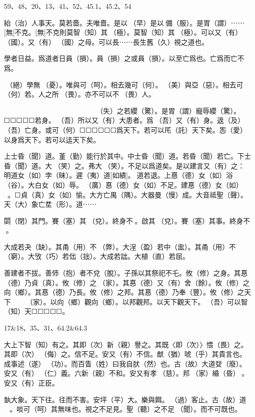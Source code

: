 \documentclass[a4paper]{ctexart}
\begin{document}
    59、48、20、13、41、52、45.1、45.2、54

    紿（治）人事天。莫若嗇。夫唯嗇。是以󶵙（早）是以󶵙備（服）。是胃（謂）⋯⋯[無]不克。[無]不克則莫智（知）其𠄨（極）。莫智（知）其𠄨（極）。可以又（有）󼷜（國）。又（有）󼷜（國）之母。可以長⋯⋯長生舊（久）視之道也。

    學者日益。爲道者日員（損）。員（損）之或員（損）。以至亡爲也。亡爲而亡不爲。

    󶴐（絕）學無𢝊（憂）。唯與可（呵）。相去幾可（何）。𡵂（美）與亞（惡）。相去可（何）若。人之所𥚸（畏）。亦不可以不𥚸（畏）人。

    𢤲（寵）辱若纓（驚）。貴大患若身。可（何）胃（謂）𢤲（寵）辱。𢤲（寵）爲下也。得之若纓（驚）。󶴡（失）之若纓（驚）。是胃（謂）寵辱纓（驚）。☐☐☐☐☐若身。󼾲（吾）所以又（有）大患者。爲󼾲（吾）又（有）身。﨤（及）󼾲（吾）亡身。或可（何）☐☐☐☐☐☐爲天下。若可以厇（託）天下矣。㤅（愛）以身爲天下。若可以迲天下矣。

    上士昏（聞）道。堇（勤）能行於其中。中士昏（聞）道。若昏（聞）若亡。下士昏（聞）道。大𦬫（笑）之。弗大𦬫（笑）。不足以爲道矣。是以建言又（有）之：明道女（如）孛（昧）。遲（夷）道[如繢]。☐道若退。上惪（德）女（如）浴（谷）。大白女（如）辱。󼧊（廣）惪（德）女（如）不足。建惪（德）女（如）󲳴☐。☐貞（真）女（如）愉。大方亡禺（隅）。大器曼（慢）成。大音祗聖（聲）。天（大）象亡坓（形）。道⋯⋯

    閟（閉）其門。賽（塞）其𨓚（兌）。終身不󼲆。啟其𨓚（兌）。賽（塞）其事。終身不󶵠。

    大成若夬（缺）。其甬（用）不󶵢（弊）。大浧（盈）若中（盅）。其甬（用）不󶵣（窮）。大攷（巧）若㑁（拙）。大成若詘。大植（直）若屈。

    善建者不拔。善伂（抱）者不兌（脫）。子孫以其祭祀不乇。攸（修）之身。其惪（德）乃貞（真）。攸（修）之𧱌（家）。其惪（德）又（有）舍（餘）。攸（修）之向（鄉）。其惪（德）乃長。攸（修）之邦。其惪（德）乃奉（豐）。攸（修）之天下☐☐☐☐☐☐☐𧱌（家）。以向（鄉）觀向（鄉）。以邦觀邦。以天下觀天下。󼾲（吾）可以智（知）天☐☐☐☐☐。

    17\&{}18、35、31、64.2\&{}64.3

    大上下智（知）有之。其即（次）新（親）譽之。其既〈即（次）〉愄（畏）之。其即（次）󶵡（侮）之。信不足。安又（有）不信。猷（猶）唬（乎）其貴言也。成事述（遂）𬒬（功）。而百眚（姓）曰我自肰（然）也。古（故）大道癹（廢）。安又（有）󶴑（仁）義。六新（親）不和。安又有孝𡥝（慈）。邦𧱌（家）緍（昏）☐。安又（有）正臣。

    埶大象。天下往。往而不害。安坪（平）大。樂與餌。󶵨（過）客止。古（故）道☐☐☐。啖可（呵）其無味也。視之不足見。聖（聽）之不足𦖞（聞）。而不可既也。
\end{document}
